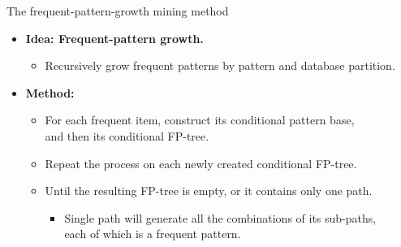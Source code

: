 \documentclass[aspectratio=169,t,xcolor=dvipsnames]{beamer}
\begin{document}
  {
    \begin{frame}{The frequent-pattern-growth mining method}
    \centering
    \begin{itemize}
      \item \textbf{Idea: Frequent-pattern growth.}
      \begin{itemize}
        \item Recursively grow frequent patterns by pattern and database partition.
      \end{itemize}
      \item \textbf{Method:}
      \begin{itemize}
        \item For each frequent item, construct its conditional pattern base, \\
        and then its conditional FP-tree.
        \item Repeat the process on each newly created conditional FP-tree.
        \item Until the resulting FP-tree is empty, or it contains only one path.
        \begin{itemize}
          \item Single path will generate all the combinations of its sub-paths, \\
          each of which is a frequent pattern.
        \end{itemize}
      \end{itemize}
    \end{itemize}
    \end{frame}
  }
\end{document}
